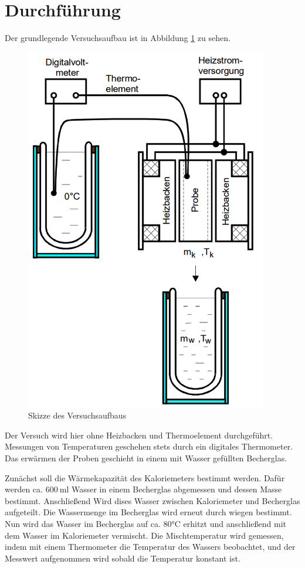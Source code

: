 \section{Durchführung}
\label{sec:Durchführung}
Der grundlegende Versuchsaufbau ist in Abbildung \ref{fig:aufbau} zu sehen.

\begin{figure}
  \centering
  \includegraphics[width=300pt]{data/aufbau.png}
  \caption{Skizze des Versuchsaufbaus \cite{Versuchsanleitung}}
  \label{fig:aufbau}
\end{figure}

Der Versuch wird hier ohne Heizbacken und Thermoelement durchgeführt. Messungen
von Temperaturen geschehen stets durch ein digitales Thermometer. Das erwärmen der
Proben geschieht in einem mit Wasser gefüllten Becherglas.

Zunächst soll die Wärmekapazität des Kaloriemeters bestimmt werden. Dafür werden ca.
$\SI{600}{\milli\litre}$ Wasser in einem Becherglas abgemessen und dessen Masse bestimmt. Anschließend
Wird dises Wasser zwischen Kaloriemeter
und Becherglas aufgeteilt. Die Wassermenge im Becherglas wird erneut durch wiegen
bestimmt. Nun wird das Wasser im Becherglas auf ca. 80°C erhitzt und anschließend
mit dem Wasser im Kaloriemeter vermischt. Die Mischtemperatur wird gemessen, indem
mit einem Thermometer die Temperatur des Wassers beobachtet, und der Messwert aufgenommen
wird sobald die Temperatur konstant ist.

